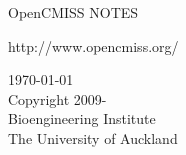 \thispagestyle{empty}

\begin{center}
   \huge OpenCMISS NOTES
   \vspace{10mm}   

   \large http://www.opencmiss.org/

   \vspace{40mm}   

   \vspace{5mm}
   \today\\   %
   \vspace{20mm}
   \small
   \textcopyright \thickspace Copyright 2009-\\
   Bioengineering Institute\\
   The University of Auckland
\end{center}





